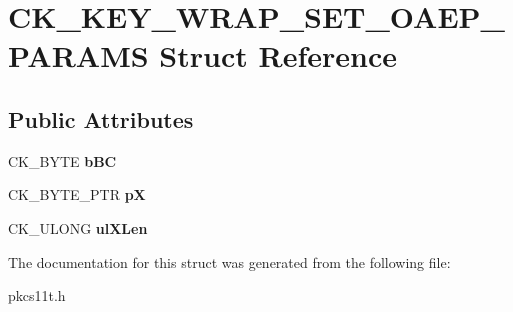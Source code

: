 \hypertarget{struct_c_k___k_e_y___w_r_a_p___s_e_t___o_a_e_p___p_a_r_a_m_s}{}\section{C\+K\+\_\+\+K\+E\+Y\+\_\+\+W\+R\+A\+P\+\_\+\+S\+E\+T\+\_\+\+O\+A\+E\+P\+\_\+\+P\+A\+R\+A\+MS Struct Reference}
\label{struct_c_k___k_e_y___w_r_a_p___s_e_t___o_a_e_p___p_a_r_a_m_s}
\subsection*{Public Attributes}
\begin{DoxyCompactItemize}
\item 
\mbox{\label{struct_c_k___k_e_y___w_r_a_p___s_e_t___o_a_e_p___p_a_r_a_m_s_a1f3cb5ec14d0842ca41e2a93beb4415f}} 
C\+K\+\_\+\+B\+Y\+TE {\bfseries b\+BC}
\item 
\mbox{\label{struct_c_k___k_e_y___w_r_a_p___s_e_t___o_a_e_p___p_a_r_a_m_s_a1a897d4e201679b8114b516ea168efa6}} 
C\+K\+\_\+\+B\+Y\+T\+E\+\_\+\+P\+TR {\bfseries pX}
\item 
\mbox{\label{struct_c_k___k_e_y___w_r_a_p___s_e_t___o_a_e_p___p_a_r_a_m_s_a42f36d257351e4712540a5f8116076d2}} 
C\+K\+\_\+\+U\+L\+O\+NG {\bfseries ul\+X\+Len}
\end{DoxyCompactItemize}


The documentation for this struct was generated from the following file\+:\begin{DoxyCompactItemize}
\item 
pkcs11t.\+h\end{DoxyCompactItemize}
